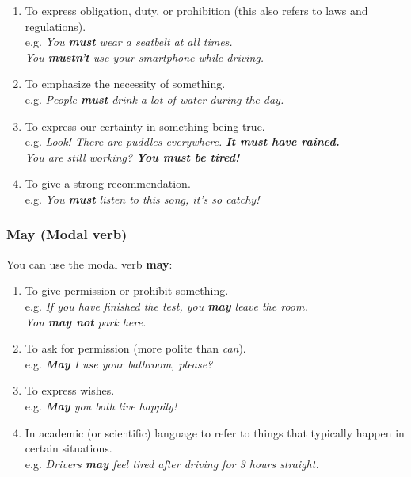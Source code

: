 \documentclass[hidelinks,10pt,a4paper]{article}
\begin{document}
\begin{enumerate}[label=(\alph*)]
	\item To express obligation, duty, or prohibition (this also refers to laws and regulations). \\
		e.g. \textit{You \textbf{must} wear a seatbelt at all times. \\
		You \textbf{mustn't} use your smartphone while driving.}
	\item To emphasize the necessity of something. \\
		e.g. \textit{People \textbf{must} drink a lot of water during the day.}
	\item To express our certainty in something being true. \\
		e.g. \textit{Look! There are puddles everywhere. \textbf{It must have rained.}\\
		You are still working? \textbf{You must be tired!} }
	\item To give a strong recommendation. \\
		e.g. \textit{You \textbf{must} listen to this song, it's so catchy!}
\end{enumerate}

\subsubsection{May (Modal verb)}
You can use the modal verb \textbf{may}:

\begin{enumerate}[label=(\alph*)]
	\item To give permission or prohibit something. \\
		e.g. \textit{If you have finished the test, you \textbf{may} leave the room. \\
		You \textbf{may not} park here.}
	\item To ask for permission (more polite than \textit{can}). \\
		e.g. \textit{\textbf{May} I use your bathroom, please?}
	\item To express wishes. \\
		e.g. \textit{\textbf{May} you both live happily!}
	\item In academic (or scientific) language to refer to things that typically happen in certain situations. \\
		e.g. \textit{Drivers \textbf{may} feel tired after driving for 3 hours straight.}
\end{enumerate}
\end{document}

